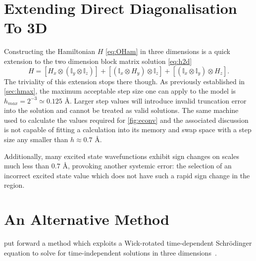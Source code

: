 \section[Extending Direct Diagonalisation To \lin{3D}]{Extending Direct Diagonalisation To 3D}\label{sec:ddiagthree}

Constructing the Hamiltonian $H$ \cref{eq:OHam} in three dimensions is a quick extension to the two dimension block matrix solution \cref{eq:h2d}
\begin{equation}
H = \left[H_x \otimes (\mathbb{I}_y \otimes \mathbb{I}_z)\right] + \left[(\mathbb{I}_x \otimes H_y) \otimes \mathbb{I}_z\right] + \left[(\mathbb{I}_x \otimes \mathbb{I}_y) \otimes H_z\right].
\label{eq:h3d}
\end{equation}
The triviality of this extension stops there though.
As previously established in \cref{sec:hmax}, the maximum acceptable step size one can apply to the model is $h_{max} = 2^{-3} \simeq 0.125$ Å.
Larger step values will introduce invalid truncation error into the solution and cannot be treated as valid solutions.
The same machine used to calculate the values required for \cref{fig:econv} and the associated discussion is not capable of fitting a  calculation into its memory and swap space with a step size any smaller than $h \approx 0.7$ Å.

Additionally, many excited state wavefunctions exhibit sign changes on scales much less than $0.7$ Å, provoking another systemic error: the selection of an incorrect excited state value which does not have such a rapid sign change in the region.

\section{An Alternative Method}\label{sec:meth3d}

\citeauthor{Strickland2010} put forward a method which exploits a Wick-rotated time-dependent Schr\"{o}dinger equation to solve for time-independent solutions in three dimensions~\cite{Strickland2010}.

